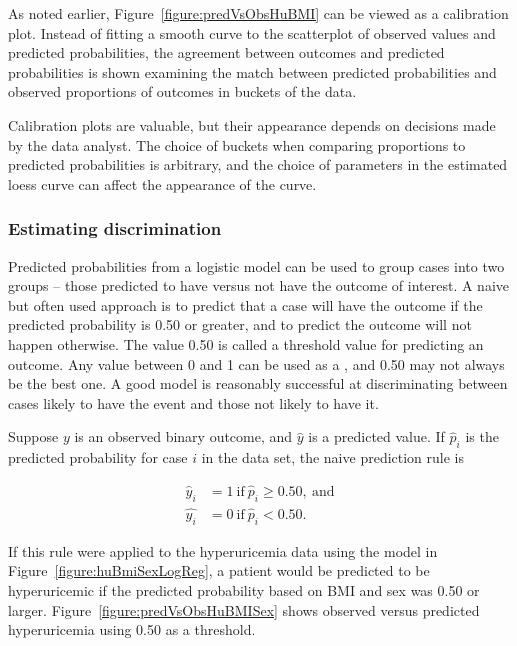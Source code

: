   As noted earlier, Figure~\ref{figure:predVsObsHuBMI} can be viewed as a calibration plot.  Instead of fitting a smooth curve to the scatterplot of observed values and predicted probabilities,  the agreement between outcomes and predicted probabilities is shown examining the match between predicted probabilities and observed proportions of outcomes in buckets of the data.

  Calibration plots are valuable, but their appearance depends on decisions made by the data analyst.  The choice of buckets when comparing proportions to predicted probabilities is arbitrary, and the choice of parameters in the estimated loess curve can affect the appearance of the curve. 
   
\subsubsection{Estimating discrimination}

Predicted probabilities from a logistic model can be used to group cases into two groups -- those predicted to have versus not have the outcome of interest.  A naive but often used approach is to predict that a case will have the outcome if the predicted probability is 0.50 or greater, and to predict the outcome will not happen otherwise.  The value 0.50 is called a threshold value for predicting an outcome.  Any value between 0 and 1 can be used as a , and 0.50 may not always be the best one.  A good model is reasonably successful at discriminating between cases likely to have the event and those not likely to have it.

Suppose $y$ is an observed binary outcome, and $\hat{y}$ is a predicted value. If $\hat{p}_i$ is the predicted probability for case $i$ in the data set, the naive prediction rule is 

\begin{align*}
   \hat{y}_i &= 1 \  \text{if}\  \hat{p}_i \geq 0.50, \  \text{and}\\
   \hat{y_i} &= 0 \ \text{if}\  \hat{p}_i < 0.50.
\end{align*} 

If this rule were applied to the hyperuricemia data using the model in Figure~\ref{figure:huBmiSexLogReg}, a patient would be predicted to be hyperuricemic if the predicted probability based on BMI and sex was 0.50 or larger.  Figure~\ref{figure:predVsObsHuBMISex} shows observed versus predicted hyperuricemia using 0.50 as a threshold.  

